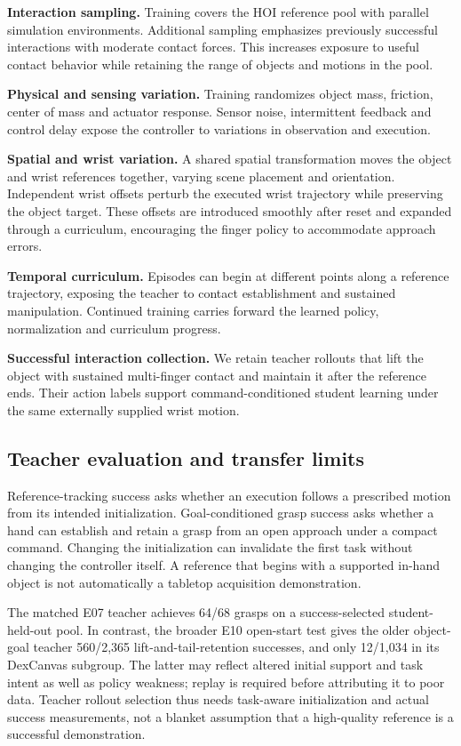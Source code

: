 \documentclass[10pt,twocolumn]{article}
\begin{document}
\textbf{Interaction sampling.} Training covers the HOI reference pool with parallel simulation environments. Additional sampling emphasizes previously successful interactions with moderate contact forces. This increases exposure to useful contact behavior while retaining the range of objects and motions in the pool.

\textbf{Physical and sensing variation.} Training randomizes object mass, friction, center of mass and actuator response. Sensor noise, intermittent feedback and control delay expose the controller to variations in observation and execution.

\textbf{Spatial and wrist variation.} A shared spatial transformation moves the object and wrist references together, varying scene placement and orientation. Independent wrist offsets perturb the executed wrist trajectory while preserving the object target. These offsets are introduced smoothly after reset and expanded through a curriculum, encouraging the finger policy to accommodate approach errors.

\textbf{Temporal curriculum.} Episodes can begin at different points along a reference trajectory, exposing the teacher to contact establishment and sustained manipulation. Continued training carries forward the learned policy, normalization and curriculum progress.

\textbf{Successful interaction collection.} We retain teacher rollouts that lift the object with sustained multi-finger contact and maintain it after the reference ends. Their action labels support command-conditioned student learning under the same externally supplied wrist motion.

\subsection{Teacher evaluation and transfer limits}

Reference-tracking success asks whether an execution follows a prescribed motion from its intended initialization. Goal-conditioned grasp success asks whether a hand can establish and retain a grasp from an open approach under a compact command. Changing the initialization can invalidate the first task without changing the controller itself. A reference that begins with a supported in-hand object is not automatically a tabletop acquisition demonstration.

The matched E07 teacher achieves 64/68 grasps on a success-selected student-held-out pool. In contrast, the broader E10 open-start test gives the older object-goal teacher 560/2,365 lift-and-tail-retention successes, and only 12/1,034 in its DexCanvas subgroup. The latter may reflect altered initial support and task intent as well as policy weakness; replay is required before attributing it to poor data. Teacher rollout selection thus needs task-aware initialization and actual success measurements, not a blanket assumption that a high-quality reference is a successful demonstration.
\end{document}
